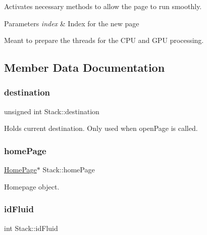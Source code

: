 Activates necessary methods to allow the page to run smoothly. 
\begin{DoxyParams}{Parameters}
{\em index} & Index for the new page\\
\hline
\end{DoxyParams}
Meant to prepare the threads for the C\+PU and G\+PU processing. 

\subsection{Member Data Documentation}
\mbox{\label{classStack_a1ef23f9e493b0f9d535eb8282114444d}} 
\subsubsection{\texorpdfstring{destination}{destination}}
{\footnotesize\ttfamily unsigned int Stack\+::destination\hspace{0.3cm}{\ttfamily [private]}}



Holds current destination. Only used when open\+Page is called. 

\mbox{\label{classStack_aa1bb5aa087f1766cec2dab2174159194}} 
\subsubsection{\texorpdfstring{homePage}{homePage}}
{\footnotesize\ttfamily \mbox{\hyperlink{classHomePage}{Home\+Page}}$\ast$ Stack\+::home\+Page\hspace{0.3cm}{\ttfamily [private]}}



Homepage object. 

\mbox{\label{classStack_a91b33262d86feccc9a358076b69a0e90}} 
\subsubsection{\texorpdfstring{idFluid}{idFluid}}
{\footnotesize\ttfamily int Stack\+::id\+Fluid\hspace{0.3cm}{\ttfamily [private]}}



